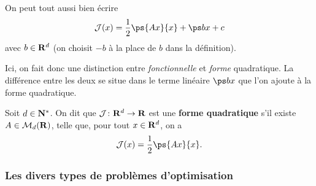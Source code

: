 \documentclass[grape]{../ceri/sty/MasterNotes}
\newcommand\J{\mathcal J}
\begin{document}
\begin{rem*}
    On peut tout aussi bien écrire
    \[ \J(x) = \frac 12\ps{Ax}{x} + \ps bx + c \]
    avec $b\in\mathbf{R}^d$ (on choisit $-b$ à la place de $b$ dans la définition).
\end{rem*}

Ici, on fait donc une distinction entre \textit{fonctionnelle} et \textit{forme} quadratique. La différence entre les deux se situe dans le terme linéaire $\ps bx$ que l'on ajoute à la forme quadratique.

\begin{defin}
    Soit $d\in\mathbf{N}^*$. On dit que $\J\colon\R^d\to\R$ est une \textbf{forme quadratique} s'il existe $\mathnormal{A}\in\mathcal M_d(\mathbf{R})$, telle que, pour tout $x\in\mathbf{R}^d$, on a
    \[ \J(x) = \frac 12\ps{Ax}{x}. \]
\end{defin}

\subsubsection{Les divers types de problèmes d'optimisation}
\end{document}
